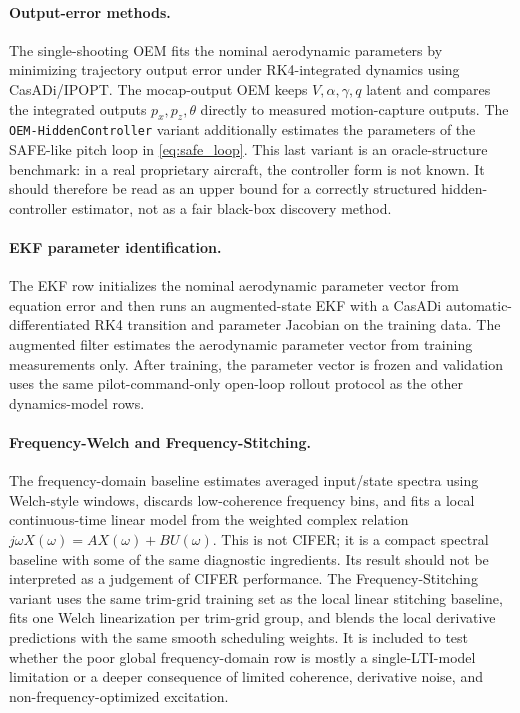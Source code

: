 \documentclass[11pt]{article}
\begin{document}
\paragraph{Output-error methods.}
The single-shooting OEM fits the nominal aerodynamic parameters by minimizing
trajectory output error under RK4-integrated dynamics using CasADi/IPOPT. The
mocap-output OEM keeps $V,\alpha,\gamma,q$ latent and compares the integrated
outputs $p_x,p_z,\theta$ directly to measured motion-capture outputs. The
\texttt{OEM-HiddenController} variant additionally estimates the parameters of
the SAFE-like pitch loop in \eqref{eq:safe_loop}. This last variant is an
oracle-structure benchmark: in a real proprietary aircraft, the controller form
is not known. It should therefore be read as an upper bound for a correctly
structured hidden-controller estimator, not as a fair black-box discovery method.

\paragraph{EKF parameter identification.}
The EKF row initializes the nominal aerodynamic parameter vector from equation
error and then runs an augmented-state EKF with a CasADi
automatic-differentiated RK4 transition and parameter Jacobian on the training
data. The augmented filter estimates the aerodynamic parameter vector from
training measurements only. After training, the parameter vector is frozen and
validation uses the same pilot-command-only open-loop rollout protocol as the
other dynamics-model rows.

\paragraph{Frequency-Welch and Frequency-Stitching.}
The frequency-domain baseline estimates averaged input/state spectra using
Welch-style windows, discards low-coherence frequency bins, and fits a local
continuous-time linear model from the weighted complex relation
$j\omega X(\omega)=AX(\omega)+BU(\omega)$. This is not CIFER; it is a compact
spectral baseline with some of the same diagnostic ingredients. Its result
should not be interpreted as a judgement of CIFER performance. The
Frequency-Stitching variant uses the same trim-grid training set as the local
linear stitching baseline, fits one Welch linearization per trim-grid group,
and blends the local derivative predictions with the same smooth scheduling
weights. It is included to test whether the poor global frequency-domain row is
mostly a single-LTI-model limitation or a deeper consequence of limited
coherence, derivative noise, and non-frequency-optimized excitation.
\end{document}
